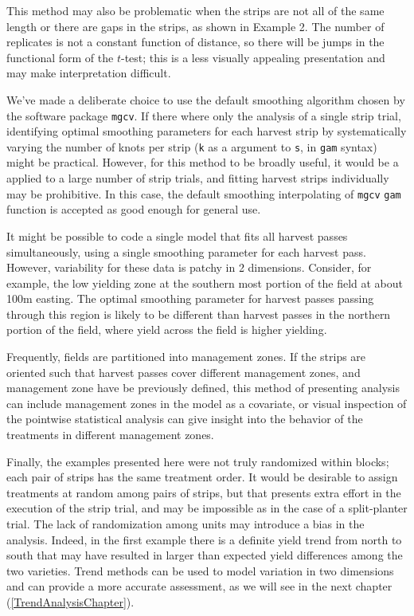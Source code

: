 \documentclass[phdcss]{SDSUThesis}
\begin{document}
This method may also be problematic when the strips are not all of the same length or there are gaps in the strips, as shown in Example 2. The number of replicates is not a constant function of distance, so there will be jumps in the functional form of the $t$-test; this is a less visually appealing presentation and may make interpretation difficult.

We've made a deliberate choice to use the default smoothing algorithm chosen by the software package \texttt{mgcv}. If there where only the analysis of a single strip trial, identifying optimal smoothing parameters for each harvest strip by systematically varying the number of knots per strip (\texttt{k} as a argument to \texttt{s}, in \texttt{gam} syntax) might be practical. However, for this method to be broadly useful, it would be a applied to a large number of strip trials, and fitting harvest strips individually may be prohibitive. In this case, the default smoothing interpolating of \texttt{mgcv} \texttt{gam} function is accepted as good enough for general use.

It might be possible to code a single model that fits all harvest passes simultaneously, using a single smoothing parameter for each harvest pass. However, variability for these data is patchy in 2 dimensions. Consider, for example, the low yielding zone at the southern most portion of the field at about 100m easting. The optimal smoothing parameter for harvest passes passing through this region is likely to be different than harvest passes in the northern portion of the field, where yield across the field is higher yielding. 

Frequently, fields are partitioned into management zones\cite{clay.7-02-2018}. If the strips are oriented such that harvest passes cover different management zones, and management zone have be previously defined, this method of presenting analysis can include management zones in the model as a covariate, or visual inspection of the pointwise statistical analysis can give insight into the behavior of the treatments in different management zones.

Finally, the examples presented here were not truly randomized within blocks; each pair of strips has the same treatment order. It would be desirable to assign treatments at random among pairs of strips, but that presents extra effort in the execution of the strip trial, and may be impossible as in the case of a split-planter trial. The lack of randomization among units may introduce a bias in the analysis. Indeed, in the first example there is a definite yield trend from north to south that may have resulted in larger than expected yield differences among the two varieties. Trend methods can be used to model variation in two dimensions and can provide a more accurate assessment, as we will see in the next chapter (\ref{TrendAnalysisChapter}).  
\end{document}
